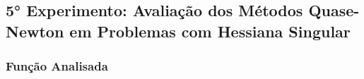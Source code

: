 \subsection{5° Experimento: Avaliação dos Métodos Quase-Newton em Problemas com Hessiana Singular}
    \subsubsection{Função Analisada}